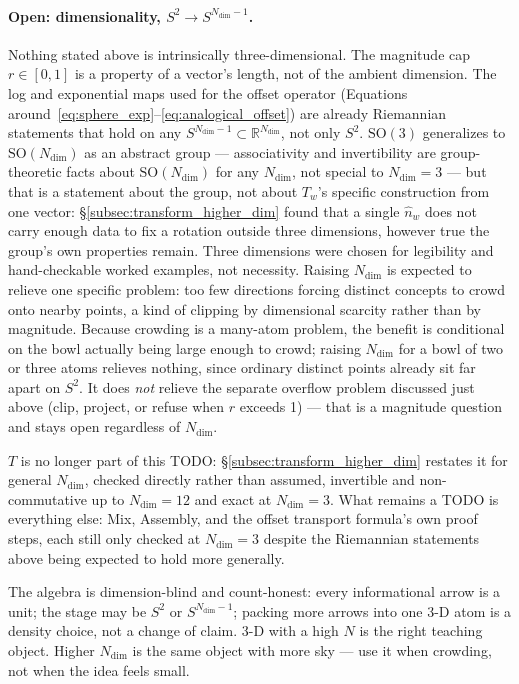 \documentclass[12pt, a4paper]{article}
\begin{document}
\paragraph{Open: dimensionality, $S^2 \to S^{N_{\mathrm{dim}}-1}$.}
\label{subsec:dimensionality_open}
Nothing stated
above is intrinsically three-dimensional. The magnitude cap
$r\in[0,1]$ is a property of a vector's length, not of the ambient
dimension. The log and exponential maps used for the offset operator
(Equations around~\eqref{eq:sphere_exp}--\eqref{eq:analogical_offset})
are already Riemannian statements that hold on any $S^{N_{\mathrm{dim}}-1}\subset
\mathbb{R}^{N_{\mathrm{dim}}}$, not only $S^2$. $\mathrm{SO}(3)$ generalizes to
$\mathrm{SO}(N_{\mathrm{dim}})$ as an abstract group --- associativity and
invertibility are group-theoretic facts about $\mathrm{SO}(N_{\mathrm{dim}})$ for
any $N_{\mathrm{dim}}$, not special to $N_{\mathrm{dim}}=3$ --- but that is a statement about the
group, not about $T_w$'s specific construction from one vector:
\S\ref{subsec:transform_higher_dim} found that a single $\hat n_w$
does not carry enough data to fix a rotation outside three
dimensions, however true the group's own properties remain. Three
dimensions were chosen for legibility and hand-checkable worked
examples, not necessity. Raising $N_{\mathrm{dim}}$ is expected to relieve one
specific problem: too few directions forcing distinct concepts to
crowd onto nearby points, a kind of clipping by dimensional scarcity
rather than by magnitude. Because crowding is a many-atom problem, the
benefit is conditional on the bowl actually being large enough to
crowd; raising $N_{\mathrm{dim}}$ for a bowl of two or three atoms relieves nothing,
since ordinary distinct points already sit far apart on $S^2$. It does
\emph{not} relieve the separate
overflow problem discussed just above (clip, project, or refuse when
$r$ exceeds 1) --- that is a magnitude question and stays open
regardless of $N_{\mathrm{dim}}$.

$T$ is no longer part of this TODO:
\S\ref{subsec:transform_higher_dim} restates it for general
$N_{\mathrm{dim}}$, checked directly rather than assumed, invertible
and non-commutative up to $N_{\mathrm{dim}}=12$ and exact at
$N_{\mathrm{dim}}=3$. What remains a TODO is everything else: Mix,
Assembly, and the offset transport formula's own proof steps, each
still only checked at $N_{\mathrm{dim}}=3$ despite the Riemannian
statements above being expected to hold more generally.

The algebra is dimension-blind and count-honest: every informational
arrow is a unit; the stage may be $S^2$ or $S^{N_{\mathrm{dim}}-1}$;
packing more arrows into one 3-D atom is a density choice, not a
change of claim. 3-D with a high $N$ is the right teaching object.
Higher $N_{\mathrm{dim}}$ is the same object with more sky --- use it
when crowding, not when the idea feels small.
\end{document}

